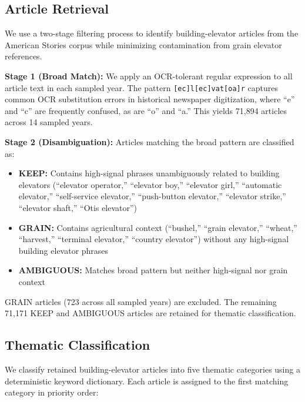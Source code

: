 \documentclass[12pt]{article}
\begin{document}
\subsection{Article Retrieval}

We use a two-stage filtering process to identify building-elevator articles from the American Stories corpus \citep{dell2023} while minimizing contamination from grain elevator references.

\textbf{Stage 1 (Broad Match):} We apply an OCR-tolerant regular expression to all article text in each sampled year. The pattern \texttt{[ec]l[ec]vat[oa]r} captures common OCR substitution errors in historical newspaper digitization, where ``e'' and ``c'' are frequently confused, as are ``o'' and ``a.'' This yields 71,894 articles across 14 sampled years.

\textbf{Stage 2 (Disambiguation):} Articles matching the broad pattern are classified as:
\begin{itemize}
  \item \textbf{KEEP:} Contains high-signal phrases unambiguously related to building elevators (``elevator operator,'' ``elevator boy,'' ``elevator girl,'' ``automatic elevator,'' ``self-service elevator,'' ``push-button elevator,'' ``elevator strike,'' ``elevator shaft,'' ``Otis elevator'')
  \item \textbf{GRAIN:} Contains agricultural context (``bushel,'' ``grain elevator,'' ``wheat,'' ``harvest,'' ``terminal elevator,'' ``country elevator'') without any high-signal building elevator phrases
  \item \textbf{AMBIGUOUS:} Matches broad pattern but neither high-signal nor grain context
\end{itemize}

GRAIN articles (723 across all sampled years) are excluded. The remaining 71,171 KEEP and AMBIGUOUS articles are retained for thematic classification.

\subsection{Thematic Classification}

We classify retained building-elevator articles into five thematic categories using a deterministic keyword dictionary. Each article is assigned to the first matching category in priority order:
\end{document}
